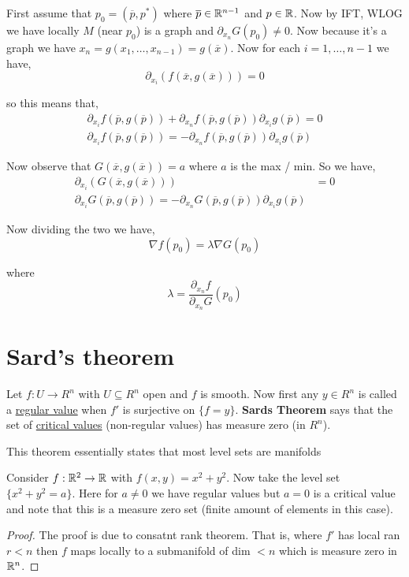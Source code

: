 \vspace{1em}

First assume that $p_{0} = (\overline{p}, p^{*})$ where $\overline{p} \in \mathbb{R}^{n - 1}$ and $p \in \mathbb{R}$. Now by IFT, WLOG we have locally $M$ (near $p_{0}$) is a graph and $\partial_{x_n} G(p_{0}) \ne 0$. Now because it's a graph we have $x_n = g(x_{1}, \dots, x_{n - 1}) = g(\overline{x})$. Now for each $i = 1, \dots, n - 1$ we have, 
\[
  \partial_{x_i} \left ( f(\overline{x}, g(\overline{x}))\right ) = 0
\]

so this means that, 
\begin{align*}
  \partial_{x_i} f(\overline{p}, g(\overline{p})) + \partial_{x_n} f(\overline{p}, g(\overline{p})) \partial_{x_i} g(\overline{p}) = 0\\
  \partial_{x_i} f(\overline{p}, g(\overline{p})) = - \partial_{x_n} f(\overline{p}, g(\overline{p})) \partial_{x_i} g(\overline{p})
\end{align*}

Now observe that $G(\overline{x}, g(\overline{x})) = a$ where $a$ is the max / min. So we have, 
\begin{align*}
  \partial_{x_i}(G(\overline{x}, g(\overline{x}))) &= 0\\
  \partial_{x_i} G(\overline{p}, g(\overline{p})) = - \partial_{x_n} G(\overline{p}, g(\overline{p})) \partial_{x_i} g(\overline{p})
\end{align*}

Now dividing the two we have, 
\[
  \nabla f(p_{0}) = \lambda \nabla G(p_{0})
\]

where $$\lambda = \frac{\partial_{x_n} f}{\partial_{x_n} G}(p_{0})$$


\section{Sard's theorem}

\begin{theorem}
  Let $f:U \to R^{n}$ with $U \subseteq R^{n}$ open and $f$ is smooth. Now first any $y \in R^{n}$ is called a \underline{regular value} when $f'$ is surjective on $\{f = y\}$. \textbf{Sards Theorem} says that the set of \underline{critical values} (non-regular values) has measure zero (in $R^{n}$).
\end{theorem}
\begin{note}
  This theorem essentially states that most level sets are manifolds
\end{note}
\begin{eg}
  Consider $f:\mathbb{R}^2 \to \mathbb{R}$ with $f(x, y) = x^2 + y^2$. Now take the level set $\{x^2 + y^2 = a\}$. Here for $a \ne 0$ we have regular values but $a = 0$ is a critical value and note that this is a measure zero set (finite amount of elements in this case).
\end{eg}
\begin{proof}
  The proof is due to consatnt rank theorem. That is, where $f'$ has local ran $r < n$ then $f$ maps locally to a submanifold of dim $< n$ which is measure zero in $\mathbb{R}^{n}$.
\end{proof}


